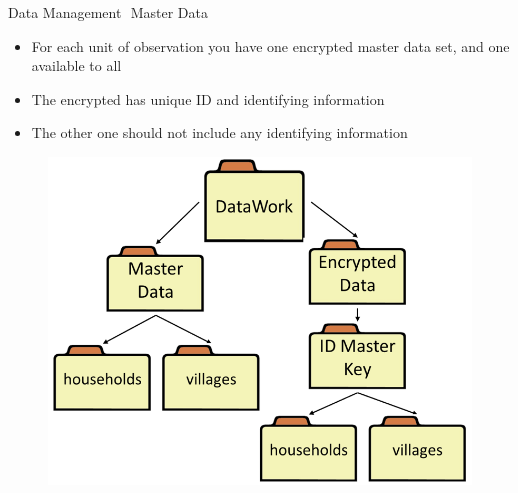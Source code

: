 \documentclass[aspectratio=169]{beamer}
\begin{document}
\begin{frame}[fragile]{Data Management  Master Data}
\begin{multicols}{2}	
	\begin{itemize}
		\item For each unit of observation you have one encrypted master data set, and one available to all
		\item The encrypted has unique ID and identifying information
		\item The other one should not include any identifying information
	\end{itemize}
	\begin{figure}
		\centering
		\includegraphics[width=\linewidth]{img/datamanage1}
	\end{figure}
\end{multicols}
\end{frame}
\end{document}
